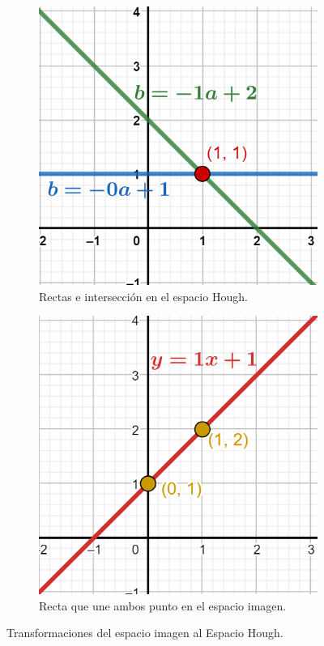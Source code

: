 \begin{figure}
\begin{subfigure}[b]{0.3\textwidth}
        \includegraphics[width=\textwidth]{imaxes/c-bases-teoricas/hough-2}
        \caption{Rectas e intersección en el espacio Hough.}
        \label{fig:hough-intersection}
    \end{subfigure}
    \hfill
    \begin{subfigure}[b]{0.3\textwidth}
        \centering
        \includegraphics[width=\textwidth]{imaxes/c-bases-teoricas/hough-3}
        \caption{Recta que une ambos punto en el espacio imagen.}
        \label{fig:hough-recta-a-b}
    \end{subfigure}
    \caption{Transformaciones del espacio imagen al Espacio Hough.}
    \label{fig:transformaciones-hough}
\end{figure}

